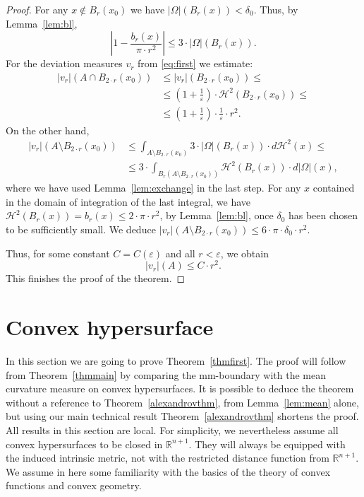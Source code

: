 \documentclass[12pt,leqno,intlimits]{amsart}
\numberwithin{equation}{section}
\theoremstyle{definition}
\theoremstyle{remark}
\newcommand{\tref}[1]{Theorem~\ref{#1}}
\newcommand{\lref}[1]{Lemma~\ref{#1}}
\newcommand{\R}{\mathbb{R}}
\begin{document}
\begin{proof}
For any $x\notin B_{r} (x_0)$ we have $| \Omega |(B_r (x)) < \delta _0$. Thus, by Lemma~\ref{lem:bl}, $$|1-\frac {b_r(x)} {\pi{\cdot}r^2} |
\leq
3\cdot |\Omega | ( B_{r} (x)).$$
For the deviation measures $v_r$ from \eqref{eq:first} we estimate:
\begin{align*}
|v_r| (A\cap B_{2{\cdot}r} (x_0))
&\leq |v_r| (B_{2{\cdot}r} (x_0)) \leq
\\
&\leq (1+ \tfrac 1 {\varepsilon}) \cdot \mathcal H^2 (B_{2{\cdot}r} (x_0)) \leq
\\
&\leq
(1+ \tfrac 1 {\varepsilon}) \cdot \tfrac 1 {\varepsilon} \cdot r^2.
\end{align*}
On the other hand,
\begin{align*}
|v_r| (A\setminus B_{2{\cdot}r} (x_0))
&\leq 
\int _{A \setminus B_{2{\cdot}r} (x_0) } 3 \cdot |\Omega| (B_r (x)) \cdot d\mathcal H^2 (x) 
\leq
\\
&\leq 3\cdot \int _{B_r (A\setminus B_{2{\cdot}r} (x_0))} \mathcal H^2 (B_r(x)) \cdot d|\Omega | (x),
\end{align*}
where we have used \lref{lem:exchange} in the last step.
For any $x$ contained in the domain of integration of the last integral, we have $\mathcal H^2 (B_r(x)) =b_r (x) \leq 2{\cdot}\pi{\cdot}r^2$, by \lref{lem:bl}, once $\delta _0$ has been chosen to be sufficiently small.
We deduce $|v_r| (A\setminus B_{2{\cdot}r} (x_0)) \leq 6 {\cdot}\pi {\cdot}\delta _0 {\cdot} r^2$.

Thus, for some constant $C=C(\varepsilon)$ and all $r<\varepsilon$, we obtain
$$|v_r|(A) \leq C\cdot r^2.$$
This finishes the proof of the theorem.
\end{proof}

\section{Convex hypersurface} \label{sec:hyper}
In this section we are going to prove \tref{thmfirst}. The proof will follow from \tref{thmmain} by comparing the mm-boundary with the mean curvature measure on convex hypersurfaces.
It is possible to deduce the theorem without a reference to \tref{alexandrovthm}, from \lref{lem:mean} alone, but using our main technical result \tref{alexandrovthm}
shortens the proof. All results in this section are local. For simplicity, we nevertheless assume all convex hypersurfaces to be closed in $\R^{n+1}$. They will always be equipped with the induced intrinsic metric, not with the restricted distance function from $\mathbb R^{n+1}$.
We assume in here some familiarity with the basics of the theory of convex functions and convex geometry.
\end{document}
